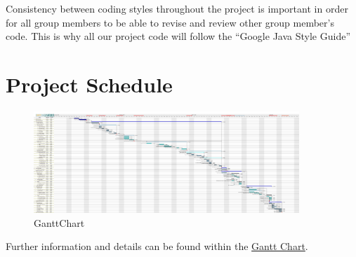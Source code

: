 \documentclass{article}
\begin{document}
Consistency between coding styles throughout the project is important in order for all group members to be able to revise and review other group member’s code. This is why all our project code will follow the “Google Java Style Guide”

\section{Project Schedule}

\begin{figure}[h!]
\centering
\includegraphics[width=100mm, scale = 2]{GanttChart}
\caption{GanttChart}
\label{fig:method}
\end{figure}
Further information and details can be found within the \href{https://gitlab.cas.mcmaster.ca/yazdinip/opencamerarefined/-/blob/master/ProjectSchedule/Gantt.pdf}{Gantt Chart}.
\end{document}
